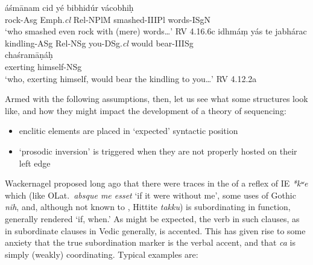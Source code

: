 \documentclass[output=paper,
modfonts
]{LSP/langsci}
\begin{document}
\begin{exe}
\ex\label{Top}
	\begin{xlist}
	\ex
		\gll {\ob}áśmānam cid{\cb} yé bibhidúr vácobhiḥ \\
			{\db}rock-Asg Emph.\textit{cl} Rel-NPlM smashed-IIIPl words-ISgN \\
		\glt `who smashed even rock with (mere) words\ldots{}' \hfill {RV 4.16.6c}
	\ex
		\gll {\ob}idhmáṃ{\cb} yás te jabhárac \\
			{\db}kindling-ASg Rel-NSg you-DSg.\textit{cl} {would bear-IIISg} \\
		
		\gll \hspace*{1em} chaśramāṇáḥ \\
			{} {exerting himself-NSg} \\
		\glt `who, exerting himself, would bear the kindling to you\ldots{}' \hfill {RV 4.12.2a}
	\end{xlist}
\end{exe}

\noindent Armed with the following assumptions, then, let us see what some structures look like, and how they might impact the development of a theory of  sequencing:

\begin{itemize}
\item enclitic elements are placed in `expected' syntactic position
\item `prosodic inversion' is triggered when they are not properly hosted on their left edge
\end{itemize}

Wackernagel proposed long ago that there were traces in the  of a reflex
of IE \textit{*kʷe} which (like OLat.\ \textit{absque me esset} `if it were
without me', some uses of Gothic \textit{nih}, and, although not known to ,
Hittite \textit{takku}) is subordinating in function, generally rendered `if, when.'
As might be expected, the verb in such clauses, as in subordinate clauses in
Vedic generally, is accented. This has given rise to some anxiety that the true
subordination marker is the verbal accent, and that \textit{ca} is simply (weakly)
coordinating. Typical examples are:

\end{document}
